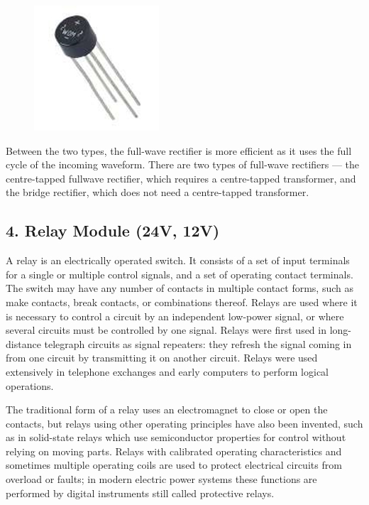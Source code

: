 \documentclass[twocolumn]{article}
\begin{document}
\begin{figure}[h]
    \centering
    \includegraphics{3.png}
    \label{fig:enter-label}
\end{figure}

\noindent Between the two types, the full-wave rectifier is 
more efficient as it uses the full cycle of the incoming waveform. There are two types of 
full-wave rectifiers — the centre-tapped fullwave rectifier, which requires a centre-tapped transformer, and the bridge rectifier, which does 
not need a centre-tapped transformer.

\subsection*{4. Relay Module (24V, 12V)}
A relay is an electrically operated switch. It 
consists of a set of input terminals for a single 
or multiple control signals, and a set of 
operating contact terminals. The switch may 
have any number of contacts in multiple contact 
forms, such as make contacts, break contacts, or 
combinations thereof.
Relays are used where it is necessary to control 
a circuit by an independent low-power signal, 
or where several circuits must be controlled by 
one signal. Relays were first used in long-distance 
telegraph circuits as signal repeaters: they 
refresh the signal coming in from one circuit by 
transmitting it on another circuit. Relays were 
used extensively in telephone exchanges and 
early computers to perform logical operations.

\noindent The traditional form of a relay uses an 
electromagnet to close or open the contacts, but 
relays using other operating principles have also 
been invented, such as in solid-state relays 
which use semiconductor properties for control 
without relying on moving parts. Relays with 
calibrated operating characteristics and 
sometimes multiple operating coils are used to 
protect electrical circuits from overload or 
faults; in modern 
electric power 
systems these 
functions are 
performed by digital 
instruments still 
called protective 
relays.
\end{document}
